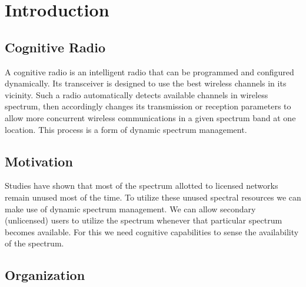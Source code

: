 \chapter{Introduction}
\section{Cognitive Radio}
A cognitive radio is an intelligent radio that can be programmed and configured dynamically. Its transceiver is designed to use the best wireless channels in its vicinity. Such a radio automatically detects available channels in wireless spectrum, then accordingly changes its transmission or reception parameters to allow more concurrent wireless communications in a given spectrum band at one location. This process is a form of dynamic spectrum management\cite{wikiCR}.

\section{Motivation}
Studies have shown that most of the spectrum allotted to licensed networks remain unused most of the time\cite{repFCC}. To utilize these unused spectral resources we can make use of dynamic spectrum management. We can allow secondary (unlicensed) users to utilize the spectrum whenever that particular spectrum becomes available. For this we need cognitive capabilities to sense the availability of the spectrum.


\section{Organization}